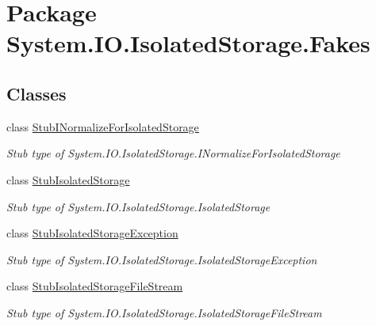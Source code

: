 \hypertarget{namespace_system_1_1_i_o_1_1_isolated_storage_1_1_fakes}{\section{Package System.\-I\-O.\-Isolated\-Storage.\-Fakes}
\label{namespace_system_1_1_i_o_1_1_isolated_storage_1_1_fakes}
}
\subsection*{Classes}
\begin{DoxyCompactItemize}
\item 
class \hyperlink{class_system_1_1_i_o_1_1_isolated_storage_1_1_fakes_1_1_stub_i_normalize_for_isolated_storage}{Stub\-I\-Normalize\-For\-Isolated\-Storage}
\begin{DoxyCompactList}\small\item\em Stub type of System.\-I\-O.\-Isolated\-Storage.\-I\-Normalize\-For\-Isolated\-Storage\end{DoxyCompactList}\item 
class \hyperlink{class_system_1_1_i_o_1_1_isolated_storage_1_1_fakes_1_1_stub_isolated_storage}{Stub\-Isolated\-Storage}
\begin{DoxyCompactList}\small\item\em Stub type of System.\-I\-O.\-Isolated\-Storage.\-Isolated\-Storage\end{DoxyCompactList}\item 
class \hyperlink{class_system_1_1_i_o_1_1_isolated_storage_1_1_fakes_1_1_stub_isolated_storage_exception}{Stub\-Isolated\-Storage\-Exception}
\begin{DoxyCompactList}\small\item\em Stub type of System.\-I\-O.\-Isolated\-Storage.\-Isolated\-Storage\-Exception\end{DoxyCompactList}\item 
class \hyperlink{class_system_1_1_i_o_1_1_isolated_storage_1_1_fakes_1_1_stub_isolated_storage_file_stream}{Stub\-Isolated\-Storage\-File\-Stream}
\begin{DoxyCompactList}\small\item\em Stub type of System.\-I\-O.\-Isolated\-Storage.\-Isolated\-Storage\-File\-Stream\end{DoxyCompactList}\end{DoxyCompactItemize}
